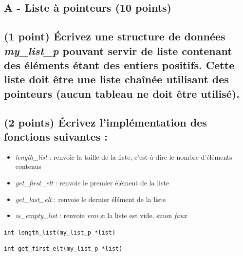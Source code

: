 \documentclass[11pt,a4paper]{article}
\begin{document}

\subsection*{A - Liste à pointeurs (10 points)}

\subsection{(1 point) \'Ecrivez une structure de données \og \textit{my\_list\_p} \fg{} pouvant servir de liste contenant des éléments étant des entiers positifs. Cette liste doit être une liste chaînée utilisant des pointeurs (aucun tableau ne doit être utilisé). }

\medskip

\begin{center}
\end{center}

\medskip

\subsection{(2 points) \'Ecrivez l'implémentation des fonctions suivantes : }

\begin{itemize}
\item \textit{length\_list} : renvoie la taille de la liste, c'est-à-dire le nombre d'éléments contenus
\item \textit{get\_first\_elt} : renvoie le premier élément de la liste
\item \textit{get\_last\_elt} : renvoie le dernier élément de la liste
\item \textit{is\_empty\_list} : renvoie \textit{vrai} si la liste est vide, sinon \textit{faux}
\end{itemize}

\medskip

\texttt{int length\_list(my\_list\_p *list)}

\begin{center}
\end{center}



\clearpage

\vfillFirst

\texttt{int get\_first\_elt(my\_list\_p *list)}
\end{document}
